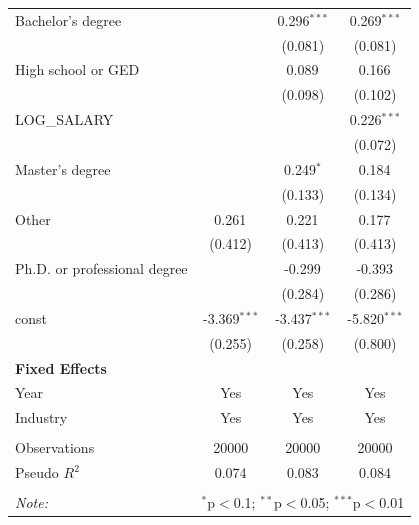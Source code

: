 \begin{table}[!htbp]
\begin{tabular}{@{\extracolsep{5pt}}lccc}
 Bachelor's degree & & 0.296$^{***}$ & 0.269$^{***}$ \\
& & (0.081) & (0.081) \\
 High school or GED & & 0.089$^{}$ & 0.166$^{}$ \\
& & (0.098) & (0.102) \\
 LOG_SALARY & & & 0.226$^{***}$ \\
& & & (0.072) \\
 Master's degree & & 0.249$^{*}$ & 0.184$^{}$ \\
& & (0.133) & (0.134) \\
 Other & 0.261$^{}$ & 0.221$^{}$ & 0.177$^{}$ \\
& (0.412) & (0.413) & (0.413) \\
 Ph.D. or professional degree & & -0.299$^{}$ & -0.393$^{}$ \\
& & (0.284) & (0.286) \\
 const & -3.369$^{***}$ & -3.437$^{***}$ & -5.820$^{***}$ \\
& (0.255) & (0.258) & (0.800) \\
 \textbf{Fixed Effects} &  &  &  \\
 Year & Yes & Yes & Yes \\
 Industry & Yes & Yes & Yes \\
\hline \\[-1.8ex]
 Observations & 20000 & 20000 & 20000 \\
 Pseudo $R^2$ & 0.074 & 0.083 & 0.084 \\
\hline
\hline \\[-1.8ex]
\textit{Note:} & \multicolumn{3}{r}{$^{*}$p$<$0.1; $^{**}$p$<$0.05; $^{***}$p$<$0.01} \\
\end{tabular}
\end{table}